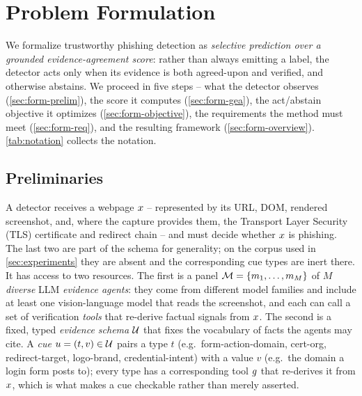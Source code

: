 \section{Problem Formulation}
\label{sec:formulation}

We formalize trustworthy phishing detection as \emph{selective prediction over a
grounded evidence-agreement score}: rather than always emitting a label, the detector
acts only when its evidence is both agreed-upon and verified, and otherwise abstains.
We proceed in five steps -- what the detector observes (\autoref{sec:form-prelim}),
the score it computes (\autoref{sec:form-gea}), the act/abstain objective it optimizes
(\autoref{sec:form-objective}), the requirements the method must meet
(\autoref{sec:form-req}), and the resulting framework (\autoref{sec:form-overview}).
\autoref{tab:notation} collects the notation.

\subsection{Preliminaries}
\label{sec:form-prelim}

A detector receives a webpage $x$ -- represented by its URL, DOM, rendered
screenshot, and, where the capture provides them, the Transport Layer Security
(TLS) certificate and redirect chain -- and must decide whether $x$ is
phishing. The last two are part of the schema for generality; on the corpus used
in \autoref{sec:experiments} they are absent and the corresponding cue types are
inert there. It has access to two resources. The first is a panel
$\mathcal{M}=\{m_1,\dots,m_M\}$ of $M$ \emph{diverse} LLM \emph{evidence agents}: they come
from different model families and include at least one vision-language model that reads
the screenshot, and each can call a set of verification \emph{tools} that re-derive
factual signals from $x$. The second is a fixed, typed \emph{evidence schema}
$\mathcal{U}$ that fixes the vocabulary of facts the agents may cite. A \emph{cue}
$u=(t,v)\in\mathcal{U}$ pairs a type $t$ (e.g.\ \textsf{form-action-domain},
\textsf{cert-org}, \textsf{redirect-target}, \textsf{logo-brand},
\textsf{credential-intent}) with a value $v$ (e.g.\ the domain a login form posts to);
every type has a corresponding tool $g$ that re-derives it from $x$, which is
what makes a cue checkable rather than merely asserted.

